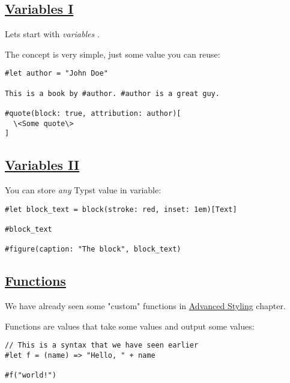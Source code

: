 \subsection{\texorpdfstring{\hyperref[variables-i]{Variables
I}}{Variables I}}\label{variables-i}

Let\textquotesingle s start with \emph{variables} .

The concept is very simple, just some value you can reuse:

\begin{verbatim}
#let author = "John Doe"

This is a book by #author. #author is a great guy.

#quote(block: true, attribution: author)[
  \<Some quote\>
]
\end{verbatim}

\pandocbounded{}

\subsection{\texorpdfstring{\hyperref[variables-ii]{Variables
II}}{Variables II}}\label{variables-ii}

You can store \emph{any} Typst value in variable:

\begin{verbatim}
#let block_text = block(stroke: red, inset: 1em)[Text]

#block_text

#figure(caption: "The block", block_text)
\end{verbatim}

\pandocbounded{}

\subsection{\texorpdfstring{\hyperref[functions-2]{Functions}}{Functions}}\label{functions-2}

We have already seen some "custom" functions in
\href{basics/scripting/../tutorial/advanced_styling.html}{Advanced
Styling} chapter.

Functions are values that take some values and output some values:

\begin{verbatim}
// This is a syntax that we have seen earlier
#let f = (name) => "Hello, " + name

#f("world!")
\end{verbatim}

